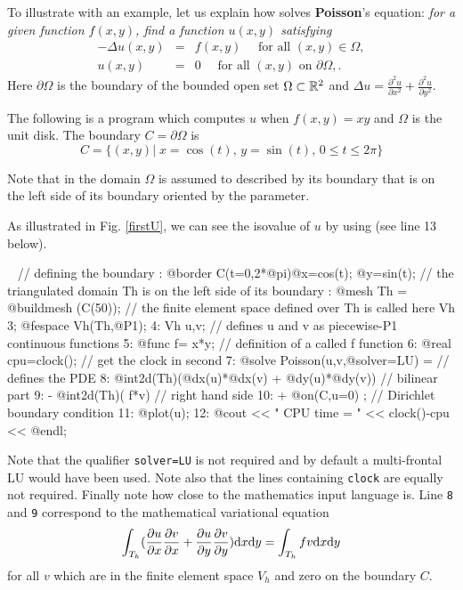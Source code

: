 \documentclass[a4paper,twoside,12pt]{book}
\def\d{\hbox{d}}
\def\p{\partial}
\begin{document}
To illustrate with an example,
let us explain how \freefempp solves
\textbf{Poisson}'s equation: \emph{for a given function $f(x,y)$, find a
function $u(x,y)$ satisfying}
\begin{eqnarray}
\label{eqn:Poisson}
-\Delta u(x,y) &=& f(x,y)\quad \mbox{ for all }(x,y)\in\Omega,
 \\ \label{eqn:Dirichlet}
  u(x,y) &=& 0\quad \mbox{ for all }(x,y)\mbox{ on }\p\Omega,.
\end{eqnarray}
Here $\partial\Omega$ is the boundary of the bounded open set $\Omega\subset \mathbb{R}^2$
and  $ \Delta u = \frac{\p^2 u}{\p x^2 } + \frac{\p^2 u}{\p y^2}$.


The following is a \freefempp program which computes $u$ when
$f(x,y)=xy$  and $\Omega$ is the unit disk. The boundary
$C=\p\Omega$ is
$$
C=\{(x,y)|\; x=\cos(t),\, y=\sin(t),\, 0\le t\le 2\pi\}
$$

Note that in \freefempp the domain $\Omega$ is assumed to described by its boundary
that is on the left side of its boundary oriented by the parameter.
%

As illustrated in Fig. \ref{firstU},
we can see the isovalue of $u$ by using  (see line 13
below).


\begin{example}\label{exm:first}~
\bFF
    // defining the boundary : @border C(t=0,2*@pi){@x=cos(t); @y=sin(t);}
    // the triangulated domain Th is on the left side of its boundary : @mesh Th = @buildmesh (C(50));
    // the finite element space defined over Th is called here Vh
 3; @fespace Vh(Th,@P1);
 4: Vh u,v;  // defines u and v as piecewise-P1 continuous functions
 5: @func f= x*y;  // definition of a called f function
 6: @real cpu=clock(); // get the clock in second
 7: @solve Poisson(u,v,@solver=LU) =  // defines the PDE
 8:    @int2d(Th)(@dx(u)*@dx(v) + @dy(u)*@dy(v))   //  bilinear part
 9:    - @int2d(Th)( f*v)          // right hand side
 10:    + @on(C,u=0)  ;  // Dirichlet boundary condition
 11: @plot(u);
 12: @cout << " CPU time = " << clock()-cpu << @endl;
\eFF
\end{example}
Note that the qualifier \texttt{solver=LU} is not required and by default a
multi-frontal LU would have been used. Note also that the lines
containing \texttt{clock} are equally not required. Finally note how
close to the mathematics \freefempp input language is. Line \texttt{8} and  \texttt{9}
correspond to the mathematical variational equation
\[
    \int_{T_h}(\frac{\p u}{\p x}\frac{\p v}{\p x}
    +\frac{\p u}{\p y}\frac{\p v}{\p
    y})\d x \d y
    =
   \int_{T_h}f v\d x\d y
\]
for all $v$ which are in the finite element space $V_h$ and zero on
the boundary $C$.
\end{document}
